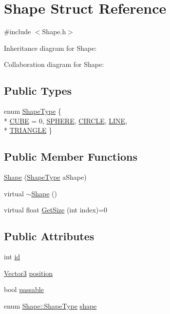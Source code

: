 \hypertarget{structShape}{}\section{Shape Struct Reference}
\label{structShape}


{\ttfamily \#include $<$Shape.\+h$>$}



Inheritance diagram for Shape\+:


Collaboration diagram for Shape\+:
\subsection*{Public Types}
\begin{DoxyCompactItemize}
\item 
enum \hyperlink{structShape_a4cb9bc6c74b4184257003c83a8d8d39e}{Shape\+Type} \{ \\*
\hyperlink{structShape_a4cb9bc6c74b4184257003c83a8d8d39ea65d203cf15d9174120295bcf72dcdbd2}{C\+U\+BE} = 0, 
\hyperlink{structShape_a4cb9bc6c74b4184257003c83a8d8d39eacb92dd1fc3c12b387994db40d29ff3da}{S\+P\+H\+E\+RE}, 
\hyperlink{structShape_a4cb9bc6c74b4184257003c83a8d8d39ea341dd3322d286ad0dcd7949f9e13f1c3}{C\+I\+R\+C\+LE}, 
\hyperlink{structShape_a4cb9bc6c74b4184257003c83a8d8d39eac35e4c7790b51e8877af1fec04d42655}{L\+I\+NE}, 
\\*
\hyperlink{structShape_a4cb9bc6c74b4184257003c83a8d8d39ea77ba41a2443cdd1048bf612b4a25ee86}{T\+R\+I\+A\+N\+G\+LE}
 \}
\end{DoxyCompactItemize}
\subsection*{Public Member Functions}
\begin{DoxyCompactItemize}
\item 
\hyperlink{structShape_aeb90f4911cd81343e313c79034fdf42e}{Shape} (\hyperlink{structShape_a4cb9bc6c74b4184257003c83a8d8d39e}{Shape\+Type} a\+Shape)
\item 
virtual \hyperlink{structShape_a935afc9e576015f967d90de56977167d}{$\sim$\+Shape} ()
\item 
virtual float \hyperlink{structShape_a878528c42f14532e5fadc9ace7024f68}{Get\+Size} (int index)=0
\end{DoxyCompactItemize}
\subsection*{Public Attributes}
\begin{DoxyCompactItemize}
\item 
int \hyperlink{structShape_a41ed02597b39a932373ab72e9afe4d40}{id}
\item 
\hyperlink{structVector3}{Vector3} \hyperlink{structShape_ad3beb609c430b969933e3b2fde67b634}{position}
\item 
bool \hyperlink{structShape_aceee5417be9d3bd3281005fb9595bbbf}{passable}
\item 
enum \hyperlink{structShape_a4cb9bc6c74b4184257003c83a8d8d39e}{Shape\+::\+Shape\+Type} \hyperlink{structShape_a90d5426ace59243509115743ad97598d}{shape}
\end{DoxyCompactItemize}


